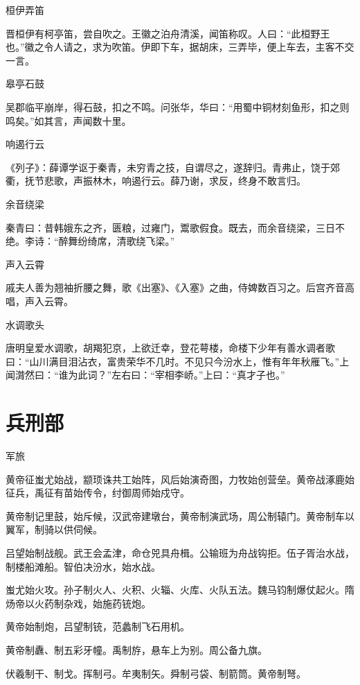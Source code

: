 \documentclass[a4paper,12pt,UTF8,twoside]{ctexbook}
\begin{document}
    桓伊弄笛
    
    晋桓伊有柯亭笛，尝自吹之。王徽之泊舟清溪，闻笛称叹。人曰：“此桓野王也。”徽之令人请之，求为吹笛。伊即下车，据胡床，三弄毕，便上车去，主客不交一言。
    
    皋亭石鼓
    
    吴郡临平崩岸，得石鼓，扣之不鸣。问张华，华曰：“用蜀中铜材刻鱼形，扣之则鸣矣。”如其言，声闻数十里。
    
    响遏行云
    
    《列子》：薛谭学讴于秦青，未穷青之技，自谓尽之，遂辞归。青弗止，饶于郊衢，抚节悲歌，声振林木，响遏行云。薛乃谢，求反，终身不敢言归。
    
    余音绕梁
    
    秦青曰：昔韩娥东之齐，匮粮，过雍门，鬻歌假食。既去，而余音绕梁，三日不绝。李诗：“醉舞纷绮席，清歌绕飞梁。”
    
    声入云霄
    
    戚夫人善为翘袖折腰之舞，歌《出塞》、《入塞》之曲，侍婢数百习之。后宫齐音高唱，声入云霄。
    
    水调歌头
    
    唐明皇爱水调歌，胡羯犯京，上欲迁幸，登花萼楼，命楼下少年有善水调者歌曰：“山川满目泪沾衣，富贵荣华不几时。不见只今汾水上，惟有年年秋雁飞。”上闻潸然曰：“谁为此词？”左右曰：“宰相李峤。”上曰：“真才子也。”
    
    
    
    \part{兵刑部}
    
    军旅
    
    黄帝征蚩尤始战，颛顼诛共工始阵，风后始演奇图，力牧始创营垒。黄帝战涿鹿始征兵，禹征有苗始传令，纣御周师始戍守。
    
    黄帝制记里鼓，始斥候，汉武帝建墩台，黄帝制演武场，周公制辕门。黄帝制车以翼军，制骑以供伺候。
    
    吕望始制战舰。武王会孟津，命仓兕具舟楫。公输班为舟战钩拒。伍子胥治水战，制楼船滩船。智伯决汾水，始水战。
    
    蚩尤始火攻。孙子制火人、火积、火辎、火库、火队五法。魏马钧制爆仗起火。隋炀帝以火药制杂戏，始施药铳炮。
    
    黄帝始制炮，吕望制铳，范蠡制飞石用机。
    
    黄帝制纛、制五彩牙幢。禹制斿，悬车上为别。周公备九旗。
    
    伏羲制干、制戈。挥制弓。牟夷制矢。舜制弓袋、制箭筒。黄帝制弩。
    
\end{document}
